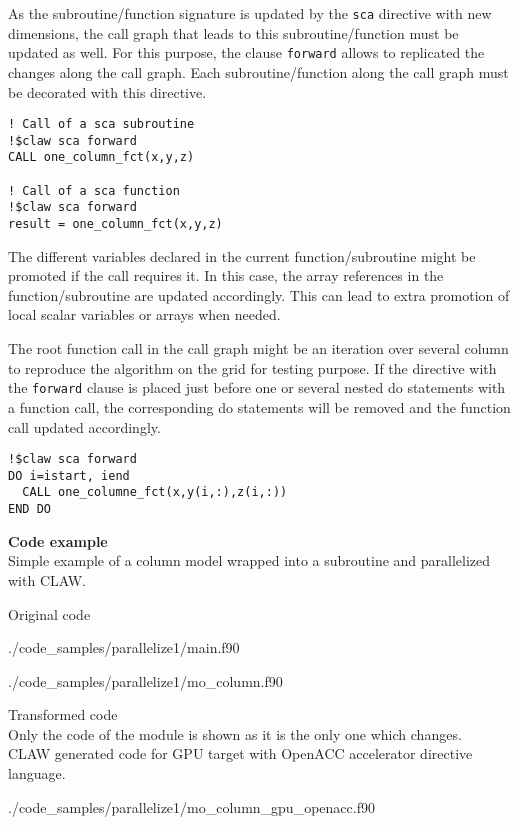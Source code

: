 As the subroutine/function signature is updated by the \lstinline!sca!
directive with new dimensions, the call graph that leads to this
subroutine/function must be updated as well. For this purpose, the clause
\lstinline!forward! allows to replicated the changes along the call graph.
Each subroutine/function along the call graph must be decorated with this
directive.

\begin{lstlisting}
! Call of a sca subroutine
!$claw sca forward
CALL one_column_fct(x,y,z)

! Call of a sca function
!$claw sca forward
result = one_column_fct(x,y,z)
\end{lstlisting}

The different variables declared in the current function/subroutine might be
promoted if the call requires it. In this case, the array references in
the function/subroutine are updated accordingly. This can lead to extra
promotion of local scalar variables or arrays when needed.

The root function call in the call graph might be an iteration over several
column to reproduce the algorithm on the grid for testing purpose. If the
directive with the \lstinline!forward! clause is placed just before one or
several nested do statements with a function call, the corresponding do
statements will be removed and the function call updated accordingly.

\begin{lstlisting}
!$claw sca forward
DO i=istart, iend
  CALL one_columne_fct(x,y(i,:),z(i,:))
END DO
\end{lstlisting}

\textbf{Code example}\\
\label{parallelize1}
Simple example of a column model wrapped into a subroutine and parallelized with
CLAW.

Original code

  {./code_samples/parallelize1/main.f90}

  {./code_samples/parallelize1/mo_column.f90}

Transformed code\\
Only the code of the module is shown as it is the only one which changes.\\

CLAW generated code for GPU target with OpenACC accelerator directive language.

  {./code_samples/parallelize1/mo_column_gpu_openacc.f90}

